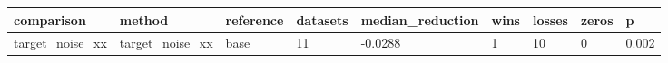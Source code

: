 \begin{tabular}{lllllllll}
\toprule
comparison & method & reference & datasets & median\_reduction & wins & losses & zeros & p \\
\midrule
target\_noise\_xx & target\_noise\_xx & base & 11 & -0.0288 & 1 & 10 & 0 & 0.002 \\
\bottomrule
\end{tabular}
